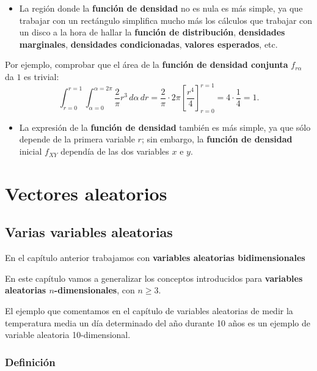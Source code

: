 \documentclass[]{book}
\providecommand{\tightlist}{%
  \setlength{\itemsep}{0pt}\setlength{\parskip}{0pt}}
\begin{document}
\begin{itemize}
\tightlist
\item
  La región donde la \textbf{función de densidad} no es nula es más simple, ya que trabajar con un rectángulo simplifica mucho más los cálculos que trabajar con un disco a la hora de hallar la \textbf{función de distribución}, \textbf{densidades marginales}, \textbf{densidades condicionadas}, \textbf{valores esperados}, etc.
\end{itemize}

Por ejemplo, comprobar que el área de la \textbf{función de densidad conjunta} \(f_{r\alpha}\) da \(1\) es trivial:
\[
\int_{r=0}^{r=1}\int_{\alpha =0}^{\alpha =2\pi}\frac{2}{\pi} r^3\, d\alpha\, dr = \frac{2}{\pi}\cdot 2\pi \left[\frac{r^4}{4}\right]_{r=0}^{r=1}=4\cdot \frac{1}{4}=1.
\]

\begin{itemize}
\tightlist
\item
  La expresión de la \textbf{función de densidad} también es más simple, ya que sólo depende de la primera variable \(r\); sin embargo, la \textbf{función de densidad} inicial \(f_{XY}\) dependía de las dos variables \(x\) e \(y\).
\end{itemize}

\hypertarget{vectores-aleatorios}{%
\chapter{Vectores aleatorios}\label{vectores-aleatorios}}

\hypertarget{varias-variables-aleatorias}{%
\section{Varias variables aleatorias}\label{varias-variables-aleatorias}}

En el capítulo anterior trabajamos con \textbf{variables aleatorias bidimensionales}

En este capítulo vamos a generalizar los conceptos introducidos para \textbf{variables aleatorias \(n\)-dimensionales}, con \(n\geq 3\).

El ejemplo que comentamos en el capítulo de variables aleatorias de medir la temperatura media un día determinado del año durante 10 años es un ejemplo de variable aleatoria 10-dimensional.

\hypertarget{definiciuxf3n-3}{%
\subsection{Definición}\label{definiciuxf3n-3}}
\end{document}
